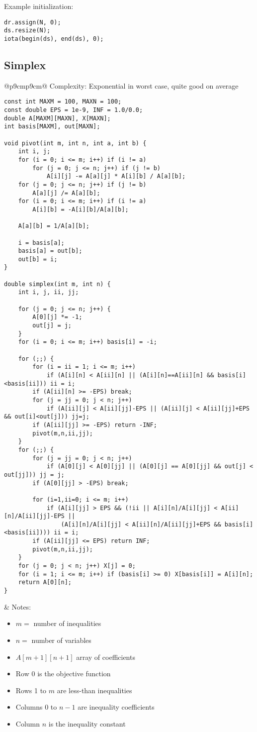 \documentclass[letterpaper]{article}
\begin{document}
Example initialization:

\begin{lstlisting}
dr.assign(N, 0);
ds.resize(N);
iota(begin(ds), end(ds), 0);
\end{lstlisting}

\clearpage
\subsection{Simplex}

\begin{tabular}{@{}p{9cm}p{9cm}@{}}
Complexity: Exponential in worst case, quite good on average
\begin{lstlisting}
const int MAXM = 100, MAXN = 100;
const double EPS = 1e-9, INF = 1.0/0.0;
double A[MAXM][MAXN], X[MAXN];
int basis[MAXM], out[MAXN];

void pivot(int m, int n, int a, int b) {
	int i, j;
	for (i = 0; i <= m; i++) if (i != a)
		for (j = 0; j <= n; j++) if (j != b)
			A[i][j] -= A[a][j] * A[i][b] / A[a][b];
	for (j = 0; j <= n; j++) if (j != b)
		A[a][j] /= A[a][b];
	for (i = 0; i <= m; i++) if (i != a)
		A[i][b] = -A[i][b]/A[a][b];

	A[a][b] = 1/A[a][b];

	i = basis[a];
	basis[a] = out[b];
	out[b] = i;
}

double simplex(int m, int n) {
	int i, j, ii, jj;

	for (j = 0; j <= n; j++) {
		A[0][j] *= -1;
		out[j] = j;
	}
	for (i = 0; i <= m; i++) basis[i] = -i;

	for (;;) {
		for (i = ii = 1; i <= m; i++)
			if (A[i][n] < A[ii][n] || (A[i][n]==A[ii][n] && basis[i]<basis[ii])) ii = i;
		if (A[ii][n] >= -EPS) break;
		for (j = jj = 0; j < n; j++)
			if (A[ii][j] < A[ii][jj]-EPS || (A[ii][j] < A[ii][jj]+EPS && out[i]<out[j])) jj=j;
		if (A[ii][jj] >= -EPS) return -INF;
		pivot(m,n,ii,jj);
	}
	for (;;) {
		for (j = jj = 0; j < n; j++)
			if (A[0][j] < A[0][jj] || (A[0][j] == A[0][jj] && out[j] < out[jj])) jj = j;
		if (A[0][jj] > -EPS) break;

		for (i=1,ii=0; i <= m; i++)
			if (A[i][jj] > EPS && (!ii || A[i][n]/A[i][jj] < A[ii][n]/A[ii][jj]-EPS ||
				(A[i][n]/A[i][jj] < A[ii][n]/A[ii][jj]+EPS && basis[i]<basis[ii]))) ii = i;
		if (A[ii][jj] <= EPS) return INF;
		pivot(m,n,ii,jj);
	}
	for (j = 0; j < n; j++) X[j] = 0;
	for (i = 1; i <= m; i++) if (basis[i] >= 0) X[basis[i]] = A[i][n];
	return A[0][n];
}
\end{lstlisting}
&
Notes:
\begin{itemize}
\item $m=$ number of inequalities
\item $n=$ number of variables
\item $A\left[m+1\right]\left[n+1\right]$ array of coefficients
\item Row 0 is the objective function
\item Rows 1 to $m$ are less-than inequalities
\item Columns 0 to $n-1$ are inequality coefficients
\item Column $n$ is the inequality constant


\end{itemize}
\end{tabular}
\end{document}

